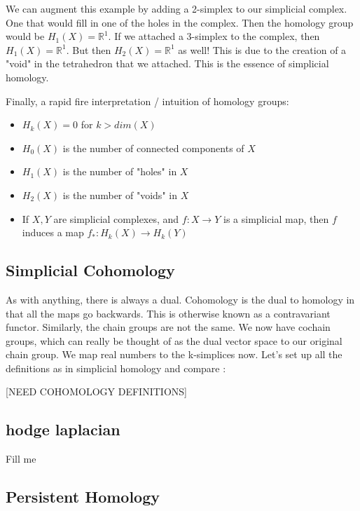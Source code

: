 \documentclass[12pt]{article}
\theoremstyle{plain}
\theoremstyle{definition}
\begin{document}
We can augment this example by adding a 2-simplex to our simplicial complex. One that would fill in one of the holes
in the complex. Then the homology group would be $H_1(X) = \mathbb{R}^1$. If we attached a 3-simplex to the complex, 
then $H_1(X) = \mathbb{R}^1$. But then $H_2(X) = \mathbb{R}^1$ as well! This is due to the creation of a "void" in the
tetrahedron that we attached.  This is the essence of simplicial homology.

Finally, a rapid fire interpretation / intuition of homology groups:

\begin{itemize}

\item $H_k(X) = 0$ for $k > dim(X)$

\item $H_0(X)$ is the number of connected components of $X$

\item $H_1(X)$ is the number of "holes" in $X$

\item $H_2(X)$ is the number of "voids" in $X$

\item If $X, Y$ are simplicial complexes, and $f: X \to Y$ is a simplicial map, then $f$ induces a map $f_*: H_k(X) \to H_k(Y)$

\end{itemize}


\subsection{Simplicial Cohomology}

As with anything, there is always a dual. Cohomology is the dual to homology in that all the maps go backwards.
This is otherwise known as a contravariant functor. Similarly, the chain groups are not the same. We now have 
cochain groups, which can really be thought of as the dual vector space to our original chain group. We map real numbers
to the k-simplices now. Let's set up all the definitions as in simplicial homology and compare :

[NEED COHOMOLOGY DEFINITIONS]

\subsection{hodge laplacian}

Fill me 

\subsection{Persistent Homology}
\end{document}
